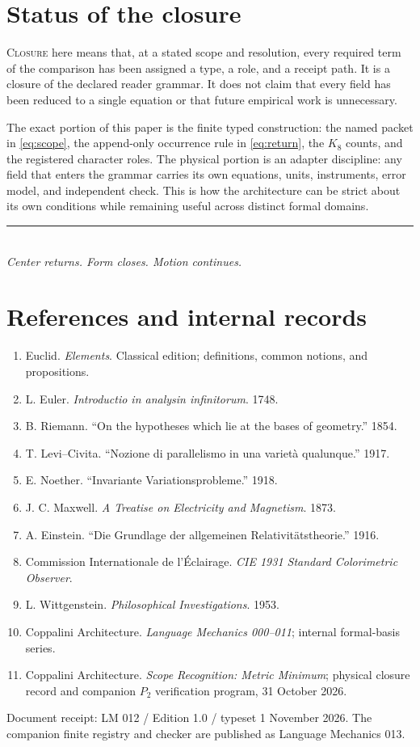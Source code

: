 \documentclass[11pt]{article}
\newcommand{\term}[1]{\textsc{#1}}
\begin{document}
\section{Status of the closure}
\term{Closure} here means that, at a stated scope and resolution, every required term of the comparison has been assigned a type, a role, and a receipt path. It is a closure of the declared reader grammar. It does not claim that every field has been reduced to a single equation or that future empirical work is unnecessary.

The exact portion of this paper is the finite typed construction: the named packet in \eqref{eq:scope}, the append-only occurrence rule in \eqref{eq:return}, the $K_8$ counts, and the registered character roles. The physical portion is an adapter discipline: any field that enters the grammar carries its own equations, units, instruments, error model, and independent check. This is how the architecture can be strict about its own conditions while remaining useful across distinct formal domains.

\vfill
\begin{center}
\rule{.75\textwidth}{0.45pt}\\[1em]
\textit{Center returns. Form closes. Motion continues.}
\end{center}

\newpage
\section*{References and internal records}
\begin{enumerate}[leftmargin=1.8em,itemsep=.55em]
\item Euclid. \textit{Elements}. Classical edition; definitions, common notions, and propositions.
\item L. Euler. \textit{Introductio in analysin infinitorum}. 1748.
\item B. Riemann. ``On the hypotheses which lie at the bases of geometry.'' 1854.
\item T. Levi--Civita. ``Nozione di parallelismo in una variet\`a qualunque.'' 1917.
\item E. Noether. ``Invariante Variationsprobleme.'' 1918.
\item J. C. Maxwell. \textit{A Treatise on Electricity and Magnetism}. 1873.
\item A. Einstein. ``Die Grundlage der allgemeinen Relativit\"atstheorie.'' 1916.
\item Commission Internationale de l'\'Eclairage. \textit{CIE 1931 Standard Colorimetric Observer}.
\item L. Wittgenstein. \textit{Philosophical Investigations}. 1953.
\item Coppalini Architecture. \textit{Language Mechanics 000--011}; internal formal-basis series.
\item Coppalini Architecture. \textit{Scope Recognition: Metric Minimum}; physical closure record and companion $P_2$ verification program, 31 October 2026.
\end{enumerate}

\vspace{1em}
{\small\color{muted}Document receipt: LM 012 / Edition 1.0 / typeset 1 November 2026. The companion finite registry and checker are published as Language Mechanics 013.}
\end{document}
